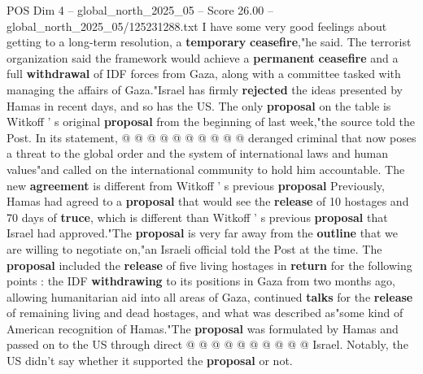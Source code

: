 \begin{textsample}{POS Dim 4 – global\_north\_2025\_05 – Score 26.00 – global\_north\_2025\_05/125231288.txt}
I have some very good feelings about getting to a long-term resolution, a \textbf{temporary} \textbf{ceasefire},"he said.
The terrorist organization said the framework would achieve a \textbf{permanent} \textbf{ceasefire} and a full \textbf{withdrawal} of IDF forces from Gaza, along with a committee tasked with managing the affairs of Gaza."Israel has firmly \textbf{rejected} the ideas presented by Hamas in recent days, and so has the US.
The only \textbf{proposal} on the table is Witkoff ' s original \textbf{proposal} from the beginning of last week,"the source told the Post.
In its statement, @ @ @ @ @ @ @ @ @ @ deranged criminal that now poses a threat to the global order and the system of international laws and human values"and called on the international community to hold him accountable.
The new \textbf{agreement} is different from Witkoff ' s previous \textbf{proposal} Previously, Hamas had agreed to a \textbf{proposal} that would see the \textbf{release} of 10 hostages and 70 days of \textbf{truce}, which is different than Witkoff ' s previous \textbf{proposal} that Israel had approved."The \textbf{proposal} is very far away from the \textbf{outline} that we are willing to negotiate on,"an Israeli official told the Post at the time.
The \textbf{proposal} included the \textbf{release} of five living hostages in \textbf{return} for the following points : the IDF \textbf{withdrawing} to its positions in Gaza from two months ago, allowing humanitarian aid into all areas of Gaza, continued \textbf{talks} for the \textbf{release} of remaining living and dead hostages, and what was described as"some kind of American recognition of Hamas."The \textbf{proposal} was formulated by Hamas and passed on to the US through direct @ @ @ @ @ @ @ @ @ @ Israel.
Notably, the US didn't say whether it supported the \textbf{proposal} or not.

\end{textsample}
